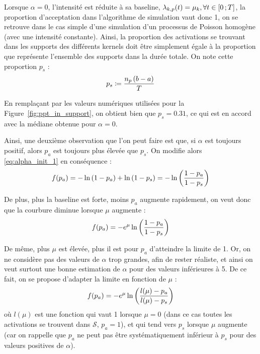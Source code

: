 Lorsque $\alpha = 0$, l'intensité est réduite à sa baseline, $\lambda_{k,p}(t) = \mu_k, \forall t \in \left[ 0 \, ; T \right]$, la proportion d'acceptation dans l'algorithme de simulation vaut donc 1, on se retrouve dans le cas simple d'une simulation d'un processus de Poisson homogène (\cad avec une intensité constante).
Ainsi, la proportion des activations se trouvant dans les supports des différents kernels doit être simplement égale à la proportion que représente l'ensemble des supports dans la durée totale.
On note cette proportion $p_s$ :
\begin{equation}
    p_s \coloneqq \frac{n_p \left( b-a \right)}{T}
\end{equation}

En remplaçant par les valeurs numériques utilisées pour la Figure~\ref{fig:ppt_in_support}, on obtient bien que $p_s = 0.31$, ce qui est en accord avec la médiane obtenue pour $\alpha = 0$.

Ainsi, une deuxième observation que l'on peut faire est que, si $\alpha$ est toujours positif, alors $p_a$ est toujours plus élevée que $p_s$.
On modifie alors \ref{eq:alpha_init_1} en conséquence :
\begin{equation}
    f(p_a) = -\ln\left( 1-p_a \right) + \ln\left( 1-p_s \right) = -\ln\left( \frac{1 - p_a}{1 - p_s} \right)
\end{equation}

De plus, plus la baseline est forte, moins $p_a$ augmente rapidement, on veut donc que la courbure diminue lorsque $\mu$ augmente :
\begin{equation}
    f(p_a) = - e^{\mu} \ln\left( \frac{1 - p_a}{1 - p_s} \right)
\end{equation}

De même, plus $\mu$ est élevée, plus il est  pour $p_a$ d'atteindre la limite de 1.
Or, on ne considère pas des valeurs de $\alpha$ trop grandes, afin de rester réaliste, et ainsi on veut surtout une bonne estimation de $\alpha$ pour des valeurs inférieures à 5.
De ce fait, on se propose d'adapter la limite en fonction de $\mu$ :
\begin{equation}
    f(p_a) = - e^{\mu} \ln\left( \frac{l(\mu) - p_a}{l(\mu)  - p_s} \right)
\end{equation}
où $l(\mu)$ est une fonction qui vaut 1 lorsque $\mu = 0$ (dans ce cas toutes les activations se trouvent dans $\mathcal{S}$, $p_a = 1$), et qui tend vers $p_s$ lorsque $\mu$ augmente (car on rappelle que $p_a$ ne peut pas être systématiquement inférieur à $p_s$ pour des valeurs positives de $\alpha$).

